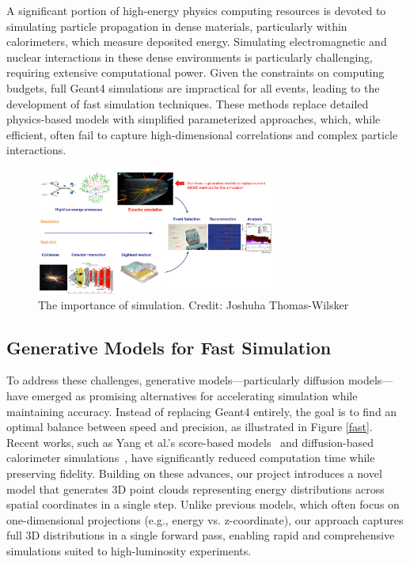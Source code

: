 A significant portion of high-energy physics computing resources is devoted to simulating particle propagation in dense materials, particularly within calorimeters, which measure deposited energy. Simulating electromagnetic and nuclear interactions in these dense environments is particularly challenging, requiring extensive computational power. Given the constraints on computing budgets, full Geant4 simulations are impractical for all events, leading to the development of fast simulation techniques. These methods replace detailed physics-based models with simplified parameterized approaches, which, while efficient, often fail to capture high-dimensional correlations and complex particle interactions.

\begin{figure}[H]
    \centering
    \includegraphics[width=0.7\textwidth]{Figures/simulation.png}
    \caption{The importance of simulation. Credit: Joshuha Thomas-Wilsker}
    \label{fig:fig1}
    \end{figure}

\subsection{Generative Models for Fast Simulation}
To address these challenges, generative models—particularly diffusion models—have emerged as promising alternatives for accelerating simulation while maintaining accuracy. Instead of replacing Geant4 entirely, the goal is to find an optimal balance between speed and precision, as illustrated in Figure \ref{fast}. Recent works, such as Yang et al.'s score-based models~\cite{song2020} and diffusion-based calorimeter simulations~\cite{mikuni2021}, have significantly reduced computation time while preserving fidelity. Building on these advances, our project introduces a novel model that generates 3D point clouds representing energy distributions across spatial coordinates in a single step. Unlike previous models, which often focus on one-dimensional projections (e.g., energy vs. z-coordinate), our approach captures full 3D distributions in a single forward pass, enabling rapid and comprehensive simulations suited to high-luminosity experiments.

